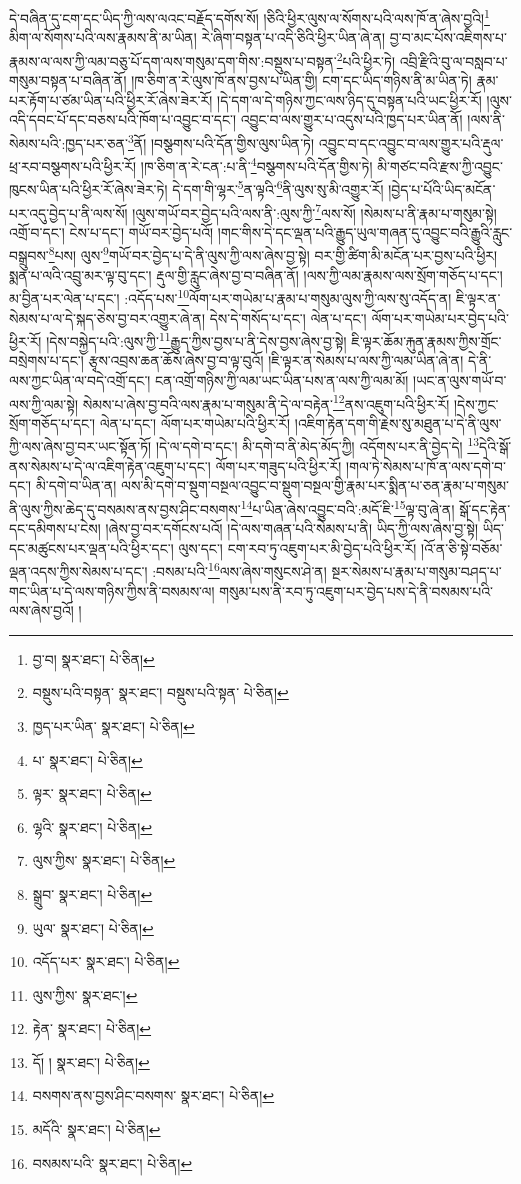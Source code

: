 དེ་བཞིན་དུ་ངག་དང་ཡིད་ཀྱི་ལས་ལའང་བརྗོད་དགོས་སོ། །ཅིའི་ཕྱིར་ལུས་ལ་སོགས་པའི་ལས་ཁོ་ན་ཞེས་བྱའི།\footnote{བྱ་བ།  སྣར་ཐང་།  པེ་ཅིན། } མིག་ལ་སོགས་པའི་ལས་རྣམས་ནི་མ་ཡིན། རེ་ཞིག་བསྟན་པ་འདི་ཅིའི་ཕྱིར་ཡིན་ཞེ་ན། བྱ་བ་མང་པོས་འཇིགས་པ་རྣམས་ལ་ལས་ཀྱི་ལམ་བཅུ་པོ་དག་ལས་གསུམ་དག་གིས་:བསྡུས་པ་བསྟན་\footnote{བསྡུས་པའི་བསྟན་  སྣར་ཐང་། བསྡུས་པའི་སྟན་  པེ་ཅིན། }པའི་ཕྱིར་ཏེ། འབྲི་རྫིའི་བུ་ལ་བསླབ་པ་གསུམ་བསྟན་པ་བཞིན་ནོ། །ཁ་ཅིག་ན་རེ་ལུས་ཁོ་ནས་བྱས་པ་ཡིན་གྱི། ངག་དང་ཡིད་གཉིས་ནི་མ་ཡིན་ཏེ། རྣམ་པར་རྟོག་པ་ཙམ་ཡིན་པའི་ཕྱིར་རོ་ཞེས་ཟེར་རོ། །དེ་དག་ལ་དེ་གཉིས་ཀྱང་ལས་ཉིད་དུ་བསྟན་པའི་ཡང་ཕྱིར་རོ། །ལུས་འདི་དབང་པོ་དང་བཅས་པའི་ཁོག་པ་འབྱུང་བ་དང་། འབྱུང་བ་ལས་གྱུར་པ་འདུས་པའི་ཁྱད་པར་ཡིན་ནོ། །ལས་ནི་སེམས་པའི་:ཁྱད་པར་ཅན་\footnote{ཁྱད་པར་ཡིན་  སྣར་ཐང་།  པེ་ཅིན། }ནོ། །བསྩགས་པའི་དོན་གྱིས་ལུས་ཡིན་ཏེ། འབྱུང་བ་དང་འབྱུང་བ་ལས་གྱུར་པའི་རྡུལ་ཕྲ་རབ་བསྩགས་པའི་ཕྱིར་རོ། །ཁ་ཅིག་ན་རེ་ངན་:པ་ནི་\footnote{པ་  སྣར་ཐང་།  པེ་ཅིན། }བསྩགས་པའི་དོན་གྱིས་ཏེ། མི་གཙང་བའི་རྫས་ཀྱི་འབྱུང་ཁུངས་ཡིན་པའི་ཕྱིར་རོ་ཞེས་ཟེར་ཏེ། དེ་དག་གི་ལྷར་\footnote{ལྟར་  སྣར་ཐང་།  པེ་ཅིན། }ན་ལྟའི་\footnote{ལྷའི་  སྣར་ཐང་།  པེ་ཅིན། }ནི་ལུས་སུ་མི་འགྱུར་རོ། །བྱེད་པ་པོའི་ཡིད་མངོན་པར་འདུ་བྱེད་པ་ནི་ལས་སོ། །ལུས་གཡོ་བར་བྱེད་པའི་ལས་ནི་:ལུས་ཀྱི་\footnote{ལུས་ཀྱིས་  སྣར་ཐང་།  པེ་ཅིན། }ལས་སོ། །སེམས་པ་ནི་རྣམ་པ་གསུམ་སྟེ། འགྲོ་བ་དང་། ངེས་པ་དང་། གཡོ་བར་བྱེད་པའོ། །གང་གིས་དེ་དང་ལྡན་པའི་རྒྱུད་ཡུལ་གཞན་དུ་འབྱུང་བའི་རྒྱུའི་རླུང་བསྒྲུབས་\footnote{སྒྲུབ་  སྣར་ཐང་།  པེ་ཅིན། }པས། ལུས་\footnote{ཡུལ་  སྣར་ཐང་།  པེ་ཅིན། }གཡོ་བར་བྱེད་པ་དེ་ནི་ལུས་ཀྱི་ལས་ཞེས་བྱ་སྟེ། བར་གྱི་ཚིག་མི་མངོན་པར་བྱས་པའི་ཕྱིར། སྨན་པ་ལའི་འབྲུ་མར་ལྟ་བུ་དང་། རྡུལ་གྱི་རླུང་ཞེས་བྱ་བ་བཞིན་ནོ། །ལས་ཀྱི་ལམ་རྣམས་ལས་སྲོག་གཅོད་པ་དང་། མ་བྱིན་པར་ལེན་པ་དང་། :འདོད་པས་\footnote{འདོད་པར་  སྣར་ཐང་།  པེ་ཅིན། }ལོག་པར་གཡེམ་པ་རྣམ་པ་གསུམ་ལུས་ཀྱི་ལས་སུ་འདོད་ན། ཇི་ལྟར་ན་སེམས་པ་ལ་དེ་སྐད་ཅེས་བྱ་བར་འགྱུར་ཞེ་ན། དེས་དེ་གསོད་པ་དང་། ལེན་པ་དང་། ལོག་པར་གཡེམ་པར་བྱེད་པའི་ཕྱིར་རོ། །དེས་བསྐྱེད་པའི་:ལུས་ཀྱི་\footnote{ལུས་ཀྱིས་  སྣར་ཐང་། }རྒྱུད་ཀྱིས་བྱས་པ་ནི་དེས་བྱས་ཞེས་བྱ་སྟེ། ཇི་ལྟར་ཆོམ་རྐུན་རྣམས་ཀྱིས་གྲོང་བསྲེགས་པ་དང་། རྩྭས་འབྲས་ཆན་ཆོས་ཞེས་བྱ་བ་ལྟ་བུའོ། །ཇི་ལྟར་ན་སེམས་པ་ལས་ཀྱི་ལམ་ཡིན་ཞེ་ན། དེ་ནི་ལས་ཀྱང་ཡིན་ལ་བདེ་འགྲོ་དང་། ངན་འགྲོ་གཉིས་ཀྱི་ལམ་ཡང་ཡིན་པས་ན་ལས་ཀྱི་ལམ་མོ། །ཡང་ན་ལུས་གཡོ་བ་ལས་ཀྱི་ལམ་སྟེ། སེམས་པ་ཞེས་བྱ་བའི་ལས་རྣམ་པ་གསུམ་ནི་དེ་ལ་བརྟེན་\footnote{རྟེན་  སྣར་ཐང་།  པེ་ཅིན། }ནས་འཇུག་པའི་ཕྱིར་རོ། །དེས་ཀྱང་སྲོག་གཅོད་པ་དང་། ལེན་པ་དང་། ལོག་པར་གཡེམ་པའི་ཕྱིར་རོ། །འཇིག་རྟེན་དག་གི་རྗེས་སུ་མཐུན་པ་དེ་ནི་ལུས་ཀྱི་ལས་ཞེས་བྱ་བར་ཡང་སྟོན་ཏོ། །དེ་ལ་དགེ་བ་དང་། མི་དགེ་བ་ནི་མེད་མོད་ཀྱི། འདོགས་པར་ནི་བྱེད་དེ། \footnote{དོ། །   སྣར་ཐང་།  པེ་ཅིན། }དེའི་སྒོ་ནས་སེམས་པ་དེ་ལ་འཇིག་རྟེན་འཇུག་པ་དང་། ལོག་པར་གཟུད་པའི་ཕྱིར་རོ། །གལ་ཏེ་སེམས་པ་ཁོ་ན་ལས་དགེ་བ་དང་། མི་དགེ་བ་ཡིན་ན། ལས་མི་དགེ་བ་སྡུག་བསྔལ་འབྱུང་བ་སྡུག་བསྔལ་གྱི་རྣམ་པར་སྨིན་པ་ཅན་རྣམ་པ་གསུམ་ནི་ལུས་ཀྱིས་ཆེད་དུ་བསམས་ནས་བྱས་ཤིང་བསགས་\footnote{བསགས་ནས་བྱས་ཤིང་བསགས་  སྣར་ཐང་།  པེ་ཅིན། }པ་ཡིན་ཞེས་འབྱུང་བའི་:མདོ་ཇི་\footnote{མདོའི་  སྣར་ཐང་།  པེ་ཅིན། }ལྟ་བུ་ཞེ་ན། སྒོ་དང་རྟེན་དང་དམིགས་པ་ངེས། །ཞེས་བྱ་བར་དགོངས་པའོ། །དེ་ལས་གཞན་པའི་སེམས་པ་ནི། ཡིད་ཀྱི་ལས་ཞེས་བྱ་སྟེ། ཡིད་དང་མཚུངས་པར་ལྡན་པའི་ཕྱིར་དང་། ལུས་དང་། ངག་རབ་ཏུ་འཇུག་པར་མི་བྱེད་པའི་ཕྱིར་རོ། །འོ་ན་ཅི་སྟེ་བཅོམ་ལྡན་འདས་ཀྱིས་སེམས་པ་དང་། :བསམ་པའི་\footnote{བསམས་པའི་  སྣར་ཐང་།  པེ་ཅིན། }ལས་ཞེས་གསུངས་ཤེ་ན། སྔར་སེམས་པ་རྣམ་པ་གསུམ་བཤད་པ་གང་ཡིན་པ་དེ་ལས་གཉིས་ཀྱིས་ནི་བསམས་ལ། གསུམ་པས་ནི་རབ་ཏུ་འཇུག་པར་བྱེད་པས་དེ་ནི་བསམས་པའི་ལས་ཞེས་བྱའོ། །
